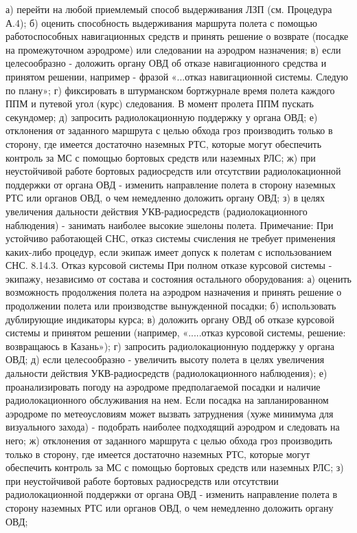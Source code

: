а)	перейти на любой приемлемый способ выдерживания ЛЗП (см. Процедура А.4);
б)	оценить способность выдерживания маршрута полета с помощью работоспособных навигационных средств и принять решение о возврате (посадке на промежуточном аэродроме) или следовании на аэродром назначения;
в)	если целесообразно - доложить органу ОВД об отказе навигационного средства и принятом решении, например - фразой «...отказ навигационной системы. Следую по плану»;
г)	фиксировать в штурманском бортжурнале время полета каждого ППМ и путевой угол (курс) следования. В момент пролета ППМ пускать секундомер;
д)	запросить радиолокационную поддержку у органа ОВД;
е)	отклонения от заданного маршрута с целью обхода гроз производить только в сторону, где имеется достаточно наземных РТС, которые могут обеспечить контроль за МС с помощью бортовых средств или наземных РЛС;
ж)	при неустойчивой работе бортовых радиосредств или отсутствии радиолокационной поддержки от органа ОВД - изменить направление полета в сторону наземных РТС или органов ОВД, о чем немедленно доложить органу ОВД;
з)	в целях увеличения дальности действия УКВ-радиосредств (радиолокационного наблюдения) - занимать наиболее высокие эшелоны полета. 
Примечание: При устойчиво работающей СНС, отказ системы счисления не требует применения каких-либо процедур, если экипаж имеет допуск к полетам с использованием СНС. 
8.14.3.	Отказ курсовой системы
При полном отказе курсовой системы - экипажу, независимо от состава и состояния остального оборудования:
а)	оценить возможность продолжения полета на аэродром назначения и принять решение о продолжении полета или производстве вынужденной посадки;
б)	использовать дублирующие индикаторы курса;
в)	доложить органу ОВД об отказе курсовой системы и принятом решении (например, «.....отказ курсовой системы, решение: возвращаюсь в Казань»);
г)	запросить радиолокационную поддержку у органа ОВД;
д)	если целесообразно - увеличить высоту полета в целях увеличения дальности действия УКВ-радиосредств (радиолокационного наблюдения);
е)	проанализировать погоду на аэродроме предполагаемой посадки и наличие радиолокационного обслуживания на нем. Если посадка на запланированном аэродроме по метеоусловиям может вызвать затруднения (хуже минимума для визуального захода) - подобрать наиболее подходящий аэродром и следовать на него;
ж)	отклонения от заданного маршрута с целью обхода гроз производить только в сторону, где имеется достаточно наземных РТС, которые могут обеспечить контроль за МС с помощью бортовых средств или наземных РЛС;
з)	при неустойчивой работе бортовых радиосредств или отсутствии радиолокационной поддержки от органа ОВД - изменить направление полета в сторону наземных РТС или органов ОВД, о чем немедленно доложить органу ОВД;
